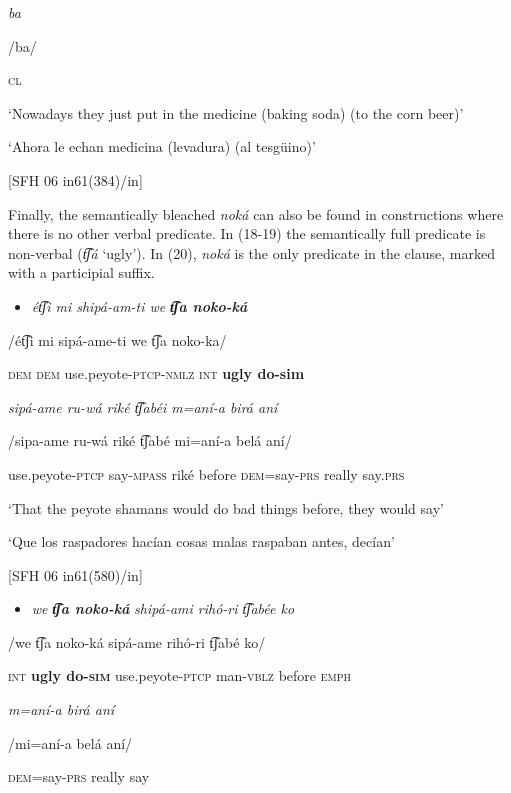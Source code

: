   \textit{ba}

 /ba/

\textsc{cl}

‘Nowadays they just put in the medicine (baking soda) (to the corn beer)’

‘Ahora le echan medicina (levadura) (al tesgüino)’

  [SFH 06 in61(384)/in]

Finally, the semantically bleached \textit{noká} can also be found in constructions where there is no other verbal predicate. In (18-19) the semantically full predicate is non-verbal (\textit{t͡ʃá} ‘ugly’). In (20), \textit{noká} is the only predicate in the clause, marked with a participial suffix.

\begin{itemize}
\item \textit{ét͡ʃi   mi   shipá-am-ti       we} \textbf{\textit{t͡ʃa   noko-ká}}
\end{itemize}

\textsc{/}ét͡ʃi  mi  sipá-ame-ti      we  t͡ʃa  noko-ka/  

\textsc{dem  dem} use.peyote-\textsc{ptcp-nmlz  int} \textbf{ugly  do-sim}

\textit{sipá-ame    ru-wá     riké   t͡ʃabéi   m=aní-a  birá   aní} 

/sipa-ame    ru-wá    riké  t͡ʃabé  mi=aní-a  belá  aní/

use.peyote-\textsc{ptcp} say-\textsc{mpass} riké before  \textsc{dem=}say-\textsc{prs} really  say.\textsc{prs}

‘That the peyote shamans would do bad things before, they would say’

‘Que los raspadores hacían cosas malas raspaban antes, decían’

  [SFH 06 in61(580)/in]

\begin{itemize}
\item \textit{we} \textbf{\textit{t͡ʃa   noko-ká}} \textit{shipá-ami    rihó-ri     t͡ʃabée ko}  
\end{itemize}

/we  t͡ʃa  noko-ká  sipá-ame    rihó-ri    t͡ʃabé  ko/

\textsc{int} \textbf{ugly  do\textsc{{}-sim}}  use.peyote-\textsc{ptcp} man-\textsc{vblz}  before  \textsc{emph} 

\textit{m=aní-a   birá   aní} 

\textsc{/}mi=aní-a  belá  aní/

\textsc{dem}=say-\textsc{prs}  really  say

